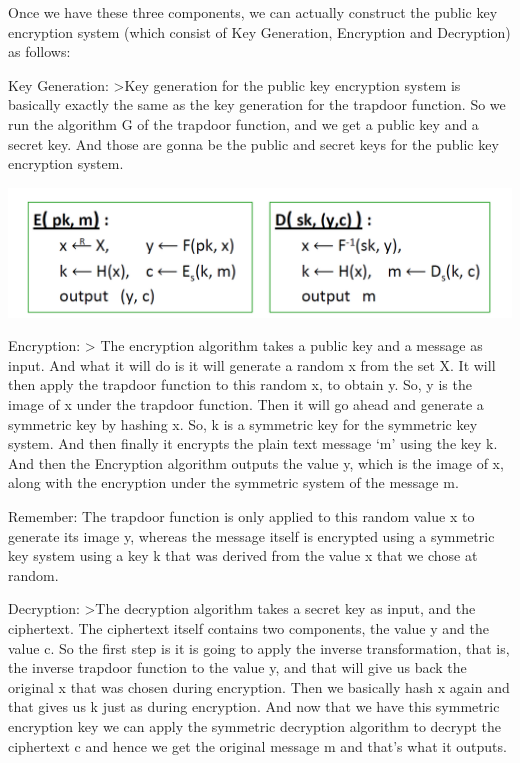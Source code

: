 \documentclass[11pt]{article}
\makeatletter
\def\maxwidth{\ifdim\Gin@nat@width>\linewidth\linewidth
    \else\Gin@nat@width\fi}
\let\Oldincludegraphics\includegraphics
\renewcommand{\includegraphics}[1]{\Oldincludegraphics[width=.8\maxwidth]{#1}}
\makeatother
\begin{document}
Once we have these three components, we can actually construct the
public key encryption system (which consist of Key Generation,
Encryption and Decryption) as follows:

Key Generation: \textgreater{}Key generation for the public key
encryption system is basically exactly the same as the key generation
for the trapdoor function. So we run the algorithm G of the trapdoor
function, and we get a public key and a secret key. And those are gonna
be the public and secret keys for the public key encryption system.

\includegraphics{./Images/PKEncFromTDF-2.png}

Encryption: \textgreater{} The encryption algorithm takes a public key
and a message as input. And what it will do is it will generate a random
x from the set X. It will then apply the trapdoor function to this
random x, to obtain y. So, y is the image of x under the trapdoor
function. Then it will go ahead and generate a symmetric key by hashing
x. So, k is a symmetric key for the symmetric key system. And then
finally it encrypts the plain text message `m' using the key k. And then
the Encryption algorithm outputs the value y, which is the image of x,
along with the encryption under the symmetric system of the message m.

Remember: The trapdoor function is only applied to this random value x
to generate its image y, whereas the message itself is encrypted using a
symmetric key system using a key k that was derived from the value x
that we chose at random.

Decryption: \textgreater{}The decryption algorithm takes a secret key as
input, and the ciphertext. The ciphertext itself contains two
components, the value y and the value c. So the first step is it is
going to apply the inverse transformation, that is, the inverse trapdoor
function to the value y, and that will give us back the original x that
was chosen during encryption. Then we basically hash x again and that
gives us k just as during encryption. And now that we have this
symmetric encryption key we can apply the symmetric decryption algorithm
to decrypt the ciphertext c and hence we get the original message m and
that's what it outputs.
\end{document}
